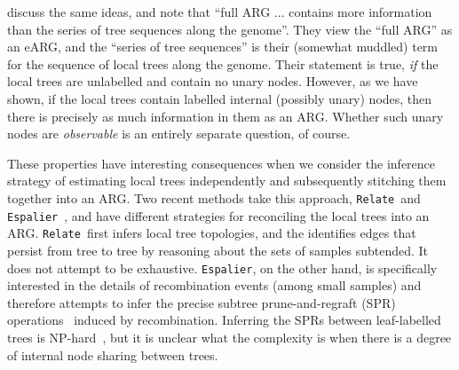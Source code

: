 \documentclass{article}
\newcommand{\relate}[0]{\texttt{Relate}}
\newcommand{\espalier}[0]{\texttt{Espalier}}
\begin{document}
\cite{shipilina2023origin} discuss the same ideas, and note that
``full ARG ... contains more information than the series of tree
sequences along the genome''. They view the ``full ARG'' as an
eARG, and the ``series of tree sequences'' is their
(somewhat muddled)
term for the sequence of local trees along the genome.
Their statement is true, \emph{if} the local trees are
unlabelled and contain
no unary nodes. However, as we have shown, if the local trees
contain labelled internal (possibly unary) nodes,
then  there is precisely as
much information in them as an ARG. Whether such unary nodes
are \emph{observable} is an entirely separate question,
of course.

These properties have interesting consequences when we
consider the inference strategy of estimating local trees
independently and subsequently stitching them together
into an ARG.
Two recent methods take this approach,
\relate\ and
\espalier~\citep{rasmussen2022espalier},
and have different strategies for reconciling the local trees into an ARG.
\relate\ first infers local tree topologies, and the identifies
edges that persist from tree to tree by reasoning about the sets of samples
subtended. It does not attempt to be exhaustive.
\espalier, on the other hand, is specifically interested
in the details of recombination events (among small samples)
and therefore attempts to infer
the precise subtree prune-and-regraft (SPR)
operations~\citep{hein1990reconstructing,song2003on,song2006properties}
induced by recombination.
Inferring the SPRs between leaf-labelled trees is
NP-hard~\citep{hein1996complexity,allen2001subtree,bordewich2005computational},
but it is unclear what the complexity is when there
is a degree of internal node sharing between trees.


\end{document}
